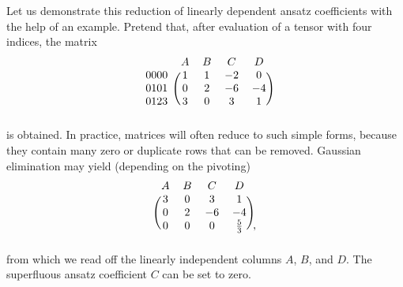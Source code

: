 Let us demonstrate this reduction of linearly dependent ansatz coefficients with the help of an example. Pretend that, after evaluation of a tensor with four indices, the matrix
\begin{equation}
  \begin{blockarray}{ccccc}
    & A & B & C & D \\
    \begin{block}{c(cccc)}
      0000 & 1 & 1 & -2 & 0 \\
      0101 & 0 & 2 & -6 & -4 \\
      0123 & 3 & 0 & 3 & 1 \\
    \end{block}
  \end{blockarray}
\end{equation}
is obtained. In practice, matrices will often reduce to such simple forms, because they contain many zero or duplicate rows that can be removed. Gaussian elimination may yield (depending on the pivoting)
\begin{equation}
  \begin{blockarray}{cccc}
    A & B & C & D \\
    \begin{block}{(cccc)}
      3 & 0 & 3 & 1 \\
      0 & 2 & -6 & -4 \\
      0 & 0 & 0 & \frac{5}{3} \\
    \end{block}
  \end{blockarray}\raisebox{-3ex}{,}
\end{equation}
from which we read off the linearly independent columns $A$, $B$, and $D$. The superfluous ansatz coefficient $C$ can be set to zero.

